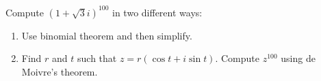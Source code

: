 Compute $(1 + \sqrt{3}i)^{100}$ in two different ways:
\begin{enumerate}[nosep,label=(\alph*)]
\item Use binomial theorem and then simplify.
\item Find $r$ and $t$ such that 
$z = r(\cos t + i \sin t)$. Compute $z^{100}$ using de Moivre's theorem.
\end{enumerate}
